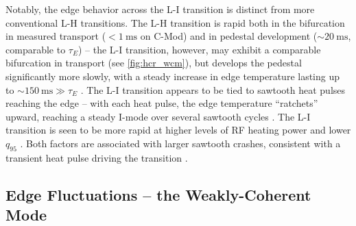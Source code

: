 Notably, the edge behavior across the L-I transition is distinct from more conventional L-H transitions.  The L-H transition is rapid both in the bifurcation in measured transport ($< \SI{1}{\milli\second}$ on C-Mod) and in pedestal development ($\sim \SI{20}{\milli\second}$, comparable to $\tau_E$) -- the L-I transition, however, may exhibit a comparable bifurcation in transport (see \cref{fig:hcr_wcm}), but develops the pedestal significantly more slowly, with a steady increase in edge temperature lasting up to $\sim \SI{150}{\milli\second} \gg \tau_E$ \cite{McDermott2009,Whyte2010}.  The L-I transition appears to be tied to sawtooth heat pulses reaching the edge -- with each heat pulse, the edge temperature ``ratchets'' upward, reaching a steady I-mode over several sawtooth cycles \cite{Hubbard2011,Hubbard2012}.  The L-I transition is seen to be more rapid at higher levels of RF heating power and lower $q_{95}$ \cite{Whyte2010}.  Both factors are associated with larger sawtooth crashes, consistent with a 
transient heat pulse driving the transition \cite{Hubbard2012}.

\subsection{Edge Fluctuations -- the Weakly-Coherent Mode}\label{subsec:hcr_imode_wcm}

\begin{figure}
 \pushtooutside
\end{figure}

